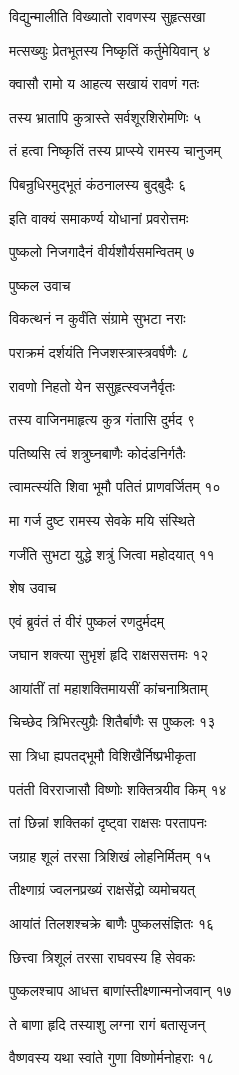 विद्युन्मालीति विख्यातो रावणस्य सुहृत्सखा

मत्सख्युः प्रेतभूतस्य निष्कृतिं कर्तुमेयिवान् ४

क्वासौ रामो य आहत्य सखायं रावणं गतः

तस्य भ्रातापि कुत्रास्ते सर्वशूरशिरोमणिः ५

तं हत्वा निष्कृतिं तस्य प्राप्स्ये रामस्य चानुजम्

पिबन्रुधिरमुद्भूतं कंठनालस्य बुद्बुदैः ६

इति वाक्यं समाकर्ण्य योधानां प्रवरोत्तमः

पुष्कलो निजगादैनं वीर्यशौर्यसमन्वितम् ७

पुष्कल उवाच

विकत्थनं न कुर्वंति संग्रामे सुभटा नराः

पराक्रमं दर्शयंति निजशस्त्रास्त्रवर्षणैः ८

रावणो निहतो येन ससुहृत्स्वजनैर्वृतः

तस्य वाजिनमाहृत्य कुत्र गंतासि दुर्मद ९

पतिष्यसि त्वं शत्रुघ्नबाणैः कोदंडनिर्गतैः

त्वामत्स्यंति शिवा भूमौ पतितं प्राणवर्जितम् १०

मा गर्ज दुष्ट रामस्य सेवके मयि संस्थिते

गर्जंति सुभटा युद्धे शत्रुं जित्वा महोदयात् ११

शेष उवाच

एवं ब्रुवंतं तं वीरं पुष्कलं रणदुर्मदम्

जघान शक्त्या सुभृशं हृदि राक्षससत्तमः १२

आयांतीं तां महाशक्तिमायसीं कांचनाश्रिताम्

चिच्छेद त्रिभिरत्युग्रैः शितैर्बाणैः स पुष्कलः १३

सा त्रिधा ह्यपतद्भूमौ विशिखैर्निष्प्रभीकृता

पतंती विरराजासौ विष्णोः शक्तित्रयीव किम् १४

तां छिन्नां शक्तिकां दृष्ट्वा राक्षसः परतापनः

जग्राह शूलं तरसा त्रिशिखं लोहनिर्मितम् १५

तीक्ष्णाग्रं ज्वलनप्रख्यं राक्षसेंद्रो व्यमोचयत्

आयांतं तिलशश्चक्रे बाणैः पुष्कलसंज्ञितः १६

छित्त्वा त्रिशूलं तरसा राघवस्य हि सेवकः

पुष्कलश्चाप आधत्त बाणांस्तीक्ष्णान्मनोजवान् १७

ते बाणा हृदि तस्याशु लग्ना रागं बतासृजन्

वैष्णवस्य यथा स्वांते गुणा विष्णोर्मनोहराः १८

